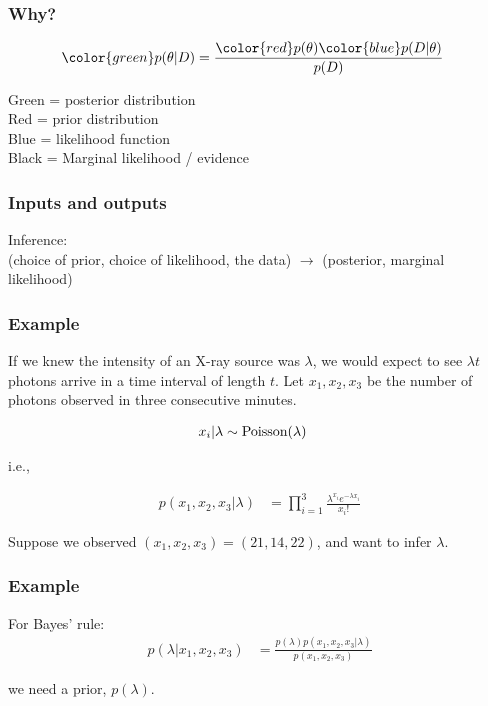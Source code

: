 \documentclass{beamer}
\begin{document}
\begin{frame}
\frametitle{Why?}


\begin{align}
{\color{green}p(\theta | D)} &= \frac{{\color{red}p(\theta)}{\color{blue}p(D|\theta)}}{p(D)}
\end{align}

Green = posterior distribution\\
Red = prior distribution\\
Blue = likelihood function\\
Black = Marginal likelihood / evidence

\end{frame}


\begin{frame}
\frametitle{Inputs and outputs}

Inference:\\ (choice of prior, choice of likelihood, the data) $\to$ (posterior, marginal likelihood)

\end{frame}


\begin{frame}
\frametitle{Example}

If we knew the intensity of an X-ray source was $\lambda$, we would expect
to see $\lambda t$ photons arrive in a time interval of length $t$.
Let $x_1, x_2, x_3$ be the number of photons observed in three consecutive
minutes.

\begin{align}
x_i | \lambda &\sim \textnormal{Poisson}(\lambda)
\end{align}

i.e.,

\begin{align}
p(x_1, x_2, x_3 | \lambda) &= \prod_{i=1}^3 \frac{\lambda^{x_i} e^{-\lambda x_i}}{x_i!}
\end{align}

Suppose we observed $(x_1, x_2, x_3) = (21, 14, 22)$, and want to infer
$\lambda$.

\end{frame}

\begin{frame}
\frametitle{Example}

For Bayes' rule:
\begin{align}
p(\lambda | x_1, x_2, x_3) &= \frac{p(\lambda)p(x_1, x_2, x_3|\lambda)}{p(x_1, x_2, x_3)}
\end{align}

we need a prior, $p(\lambda)$.

\end{frame}
\end{document}
